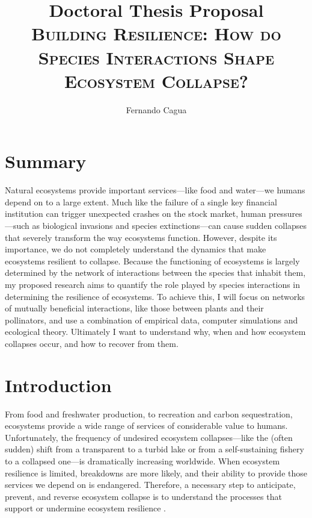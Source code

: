 \documentclass[a4paper]{article}
\title{
	{\normalsize Doctoral Thesis Proposal} \\
	{\LARGE \textsc{Building Resilience: How do Species Interactions Shape Ecosystem Collapse?}}
}
\author{
  {\large Fernando Cagua}
}
\date{}
\begin{document}
\maketitle

\chapter*{Summary}

Natural ecosystems provide important services---like food and water---we humans depend on to a large extent.
Much like the failure of a single key financial institution can trigger unexpected crashes on the stock market, human pressures---such as biological invasions and species extinctions---can cause sudden collapses that severely transform the way ecosystems function.
However, despite its importance, we do not completely understand the dynamics that make ecosystems resilient to collapse.
Because the functioning of ecosystems is largely determined by the network of interactions between the species that inhabit them, my proposed research aims to quantify the role played by species interactions in determining the resilience of ecosystems.
To achieve this, I will focus on networks of mutually beneficial interactions, like those between plants and their pollinators, and use a combination of empirical data, computer simulations and ecological theory.
Ultimately I want to understand why, when and how ecosystem collapses occur, and how to recover from them.

\chapter*{Introduction}

From food and freshwater production, to recreation and carbon sequestration, ecosystems provide a wide range of services of considerable value to humans.
Unfortunately, the frequency of undesired ecosystem collapses---like the (often sudden) shift from a transparent to a turbid lake or from a self-sustaining fishery to a collapsed one---is dramatically increasing worldwide\citep{Scheffer2001a}.
When ecosystem resilience is limited, breakdowns are more likely, and their ability to provide those services we depend on is endangered.
Therefore, a necessary step to anticipate, prevent, and reverse ecosystem collapse is to understand the processes that support or undermine ecosystem resilience \citep{Hughes2005, Tylianakis2008}.
\end{document}
